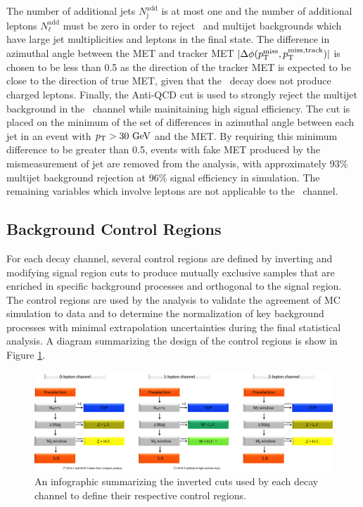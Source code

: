 The number of additional jets $N_{\mathrm{j}}^{\mathrm{add}}$ is at most one and the number of additional leptons $N_{\mathrm{\ell}}^{\mathrm{add}}$ must be zero in order to reject \qrkt\qrktbar\ and multijet backgrounds which have large jet multiplicities and leptons in the final state. The difference in azimuthal angle between the MET and tracker MET $| \Delta\phi(p_{\mathrm{T}}^{\mathrm{miss}}, p_{\mathrm{T}}^{\mathrm{miss, track}}) |$ is chosen to be less than 0.5 as the direction of the tracker MET is expected to be close to the direction of true MET, given that the \bosZ\ decay does not produce charged leptons. Finally, the Anti-QCD cut is used to strongly reject the multijet background in the \ZnnH\ channel while mainitaining high signal efficiency. The cut is placed on the minimum of the set of differences in azimuthal angle between each jet in an event with $p_{\mathrm{T}} > 30\ \mathrm{GeV}$ and the MET. By requiring this minimum difference to be greater than 0.5, events with fake MET produced by the mismeasurement of jet \pT are removed from the analysis, with approximately 93\% multijet background rejection at 96\% signal efficiency in simulation. The remaining variables which involve leptons are not applicable to the \ZnnH\ channel.

\subsection{Background Control Regions} \label{CRs}

For each decay channel, several control regions are defined by inverting and modifying signal region cuts to produce mutually exclusive samples that are enriched in specific background processes and orthogonal to the signal region. The control regions are used by the analysis to validate the agreement of MC simulation to data and to determine the normalization of key background processes with minimal extrapolation uncertainties during the final statistical analysis. A diagram summarizing the design of the control regions is show in Figure \ref{fig:controlregiondef}.

\begin{figure}[htbp]
  \centering
    \includegraphics[width=6in]{images/CR_VH}
    \caption[\VHbb\ Control Region Definitions]{An infographic summarizing the inverted cuts used by each decay channel to define their respective control regions.}
    \label{fig:controlregiondef}
\end{figure}

